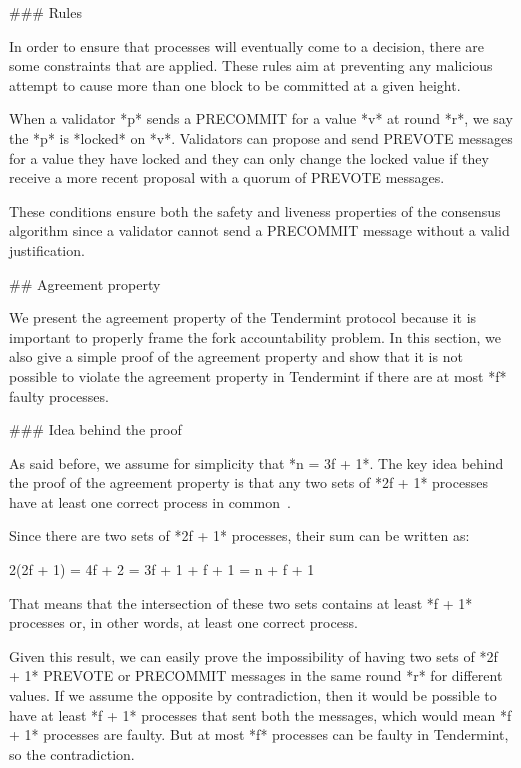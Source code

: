 \documentclass[a4paper,11pt,oneside]{report}
\begin{document}
\begin{markdown}

### Rules

In order to ensure that processes will eventually come to a decision, there are some constraints that are applied. These rules aim at preventing any malicious attempt to cause more than one block to be committed at a given height. 

When a validator *p* sends a PRECOMMIT for a value *v* at round *r*, we say the *p* is *locked* on *v*. Validators can propose and send PREVOTE messages for a value they have locked and they can only change the locked value if they receive a more recent proposal with a quorum of PREVOTE messages. 

These conditions ensure both the safety and liveness properties of the consensus algorithm since a validator cannot send a PRECOMMIT message without a valid justification.

## Agreement property

We present the agreement property of the Tendermint protocol because it is important to properly frame the fork accountability problem. In this section, we also give a simple proof of the agreement property and show that it is not possible to violate the agreement property in Tendermint if there are at most *f* faulty processes.

### Idea behind the proof

As said before, we assume for simplicity that *n = 3f + 1*.
The key idea behind the proof of the agreement property is that any two sets of *2f + 1* processes have at least one correct process in common~\cite{buchman2018latest}.

Since there are two sets of *2f + 1* processes, their sum can be written as:
 
    2(2f + 1) = 4f + 2 = 3f + 1 + f + 1 = n + f + 1
     
That means that the intersection of these two sets contains at least *f + 1* processes or, in other words, at least one correct process.  

Given this result, we can easily prove the impossibility of having two sets of *2f + 1* PREVOTE or PRECOMMIT messages in the same round *r* for different values. If we assume the opposite by contradiction, then it would be possible to have at least *f + 1* processes that sent both the messages, which would mean *f + 1* processes are faulty. But at most *f* processes can be faulty in Tendermint, so the contradiction.


\end{markdown}
\end{document}
